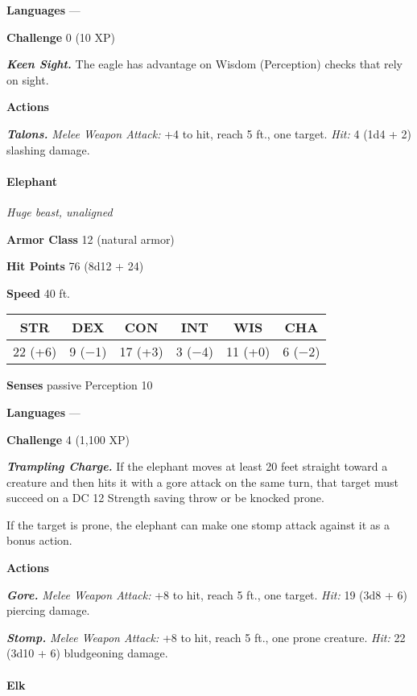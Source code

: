 \documentclass[
]{article}
\begin{document}
\textbf{Languages} ---

\textbf{Challenge} 0 (10 XP)

\emph{\textbf{Keen Sight.}} The eagle has advantage on Wisdom
(Perception) checks that rely on sight.

\textbf{Actions}

\emph{\textbf{Talons.}} \emph{Melee Weapon Attack:} +4 to hit, reach 5
ft., one target. \emph{Hit:} 4 (1d4 + 2) slashing damage.

\hypertarget{elephant}{%
\paragraph{Elephant}\label{elephant}}

\emph{Huge beast, unaligned}

\textbf{Armor Class} 12 (natural armor)

\textbf{Hit Points} 76 (8d12 + 24)

\textbf{Speed} 40 ft.

\begin{longtable}[]{@{}cccccc@{}}
\toprule
STR & DEX & CON & INT & WIS & CHA\tabularnewline
\midrule
\endhead
22 (+6) & 9 (−1) & 17 (+3) & 3 (−4) & 11 (+0) & 6 (−2)\tabularnewline
\bottomrule
\end{longtable}

\textbf{Senses} passive Perception 10

\textbf{Languages} ---

\textbf{Challenge} 4 (1,100 XP)

\emph{\textbf{Trampling Charge.}} If the elephant moves at least 20 feet
straight toward a creature and then hits it with a gore attack on the
same turn, that target must succeed on a DC 12 Strength saving throw or
be knocked prone.

If the target is prone, the elephant can make one stomp attack against
it as a bonus action.

\textbf{Actions}

\emph{\textbf{Gore.}} \emph{Melee Weapon Attack:} +8 to hit, reach 5
ft., one target. \emph{Hit:} 19 (3d8 + 6) piercing damage.

\emph{\textbf{Stomp.}} \emph{Melee Weapon Attack:} +8 to hit, reach 5
ft., one prone creature. \emph{Hit:} 22 (3d10 + 6) bludgeoning damage.

\hypertarget{elk}{%
\paragraph{Elk}\label{elk}}
\end{document}
